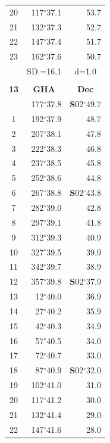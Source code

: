\documentclass[10pt, a4paper]{report}
\begin{document}
\begin{scriptsize}
\begin{tabular*}{0.2\textwidth}[t]{@{\extracolsep{\fill}}|c|rr|}
20 & 117$^\circ$37.1 & 53.7\\
21 & 132$^\circ$37.3 & \raisebox{0.24ex}{\boldmath$\cdot$~\boldmath$\cdot$~~}52.7\\
22 & 147$^\circ$37.4 & 51.7\\
23 & 162$^\circ$37.6 & 50.7\\
\hline
\rule{0pt}{2.4ex} & \multicolumn{1}{c}{SD.=16.1} & \multicolumn{1}{c|}{d=1.0}\\
\hline
\multicolumn{1}{c}{}\\[-0.5ex]\hline
\multicolumn{1}{|c|}{\rule{0pt}{2.6ex}\textbf{13}} & \multicolumn{1}{c}{\textbf{GHA}} & \multicolumn{1}{c|}{\textbf{Dec}}\\
\hline\rule{0pt}{2.6ex}\noindent
0 & 177$^\circ$37.8 & \textbf{S}02$^\circ$49.7\\
1 & 192$^\circ$37.9 & 48.7\\
2 & 207$^\circ$38.1 & 47.8\\
3 & 222$^\circ$38.3 & \raisebox{0.24ex}{\boldmath$\cdot$~\boldmath$\cdot$~~}46.8\\
4 & 237$^\circ$38.5 & 45.8\\
5 & 252$^\circ$38.6 & 44.8\\[2Pt]
6 & 267$^\circ$38.8 & \textbf{S}02$^\circ$43.8\\
7 & 282$^\circ$39.0 & 42.8\\
8 & 297$^\circ$39.1 & 41.8\\
9 & 312$^\circ$39.3 & \raisebox{0.24ex}{\boldmath$\cdot$~\boldmath$\cdot$~~}40.9\\
10 & 327$^\circ$39.5 & 39.9\\
11 & 342$^\circ$39.7 & 38.9\\[2Pt]
12 & 357$^\circ$39.8 & \textbf{S}02$^\circ$37.9\\
13 & 12$^\circ$40.0 & 36.9\\
14 & 27$^\circ$40.2 & 35.9\\
15 & 42$^\circ$40.3 & \raisebox{0.24ex}{\boldmath$\cdot$~\boldmath$\cdot$~~}34.9\\
16 & 57$^\circ$40.5 & 34.0\\
17 & 72$^\circ$40.7 & 33.0\\[2Pt]
18 & 87$^\circ$40.9 & \textbf{S}02$^\circ$32.0\\
19 & 102$^\circ$41.0 & 31.0\\
20 & 117$^\circ$41.2 & 30.0\\
21 & 132$^\circ$41.4 & \raisebox{0.24ex}{\boldmath$\cdot$~\boldmath$\cdot$~~}29.0\\
22 & 147$^\circ$41.6 & 28.0\\

\end{tabular*}
\end{scriptsize}
\end{document}
